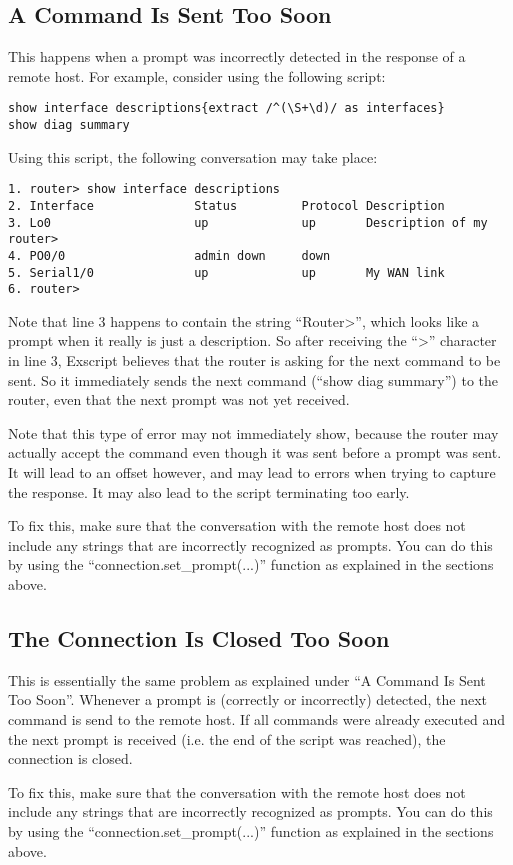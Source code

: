 \subsection{A Command Is Sent Too Soon}

This happens when a prompt was incorrectly detected in the response of a 
remote host. For example, consider using the following script:

\begin{lstlisting}
show interface descriptions{extract /^(\S+\d)/ as interfaces}
show diag summary
\end{lstlisting}

Using this script, the following conversation may take place:

\begin{lstlisting}
1. router> show interface descriptions
2. Interface              Status         Protocol Description
3. Lo0                    up             up       Description of my router>
4. PO0/0                  admin down     down     
5. Serial1/0              up             up       My WAN link
6. router> 
\end{lstlisting}

Note that line 3 happens to contain the string ``Router>'', which looks like 
a prompt when it really is just a description. So after receiving the ``>'' 
character in line 3, Exscript believes that the router is asking for the 
next command to be sent. So it immediately sends the next command (``show 
diag summary'') to the router, even that the next prompt was not yet received.

Note that this type of error may not immediately show, because the router may 
actually accept the command even though it was sent before a prompt was sent. 
It will lead to an offset however, and may lead to errors when trying to 
capture the response. It may also lead to the script terminating too early.

To fix this, make sure that the conversation with the remote host does 
not include any strings that are incorrectly recognized as prompts. You can 
do this by using the ``connection.set\_prompt(...)'' function as explained 
in the sections above. 


\subsection{The Connection Is Closed Too Soon}

This is essentially the same problem as explained under ``A Command Is Sent 
Too Soon''. Whenever a prompt is (correctly or incorrectly) detected, 
the next command is send to the remote host.
If all commands were already executed and the next prompt is received (i.e. 
the end of the script was reached), the connection is closed.

To fix this, make sure that the conversation with the remote host does 
not include any strings that are incorrectly recognized as prompts. You can 
do this by using the ``connection.set\_prompt(...)'' function as explained 
in the sections above. 

